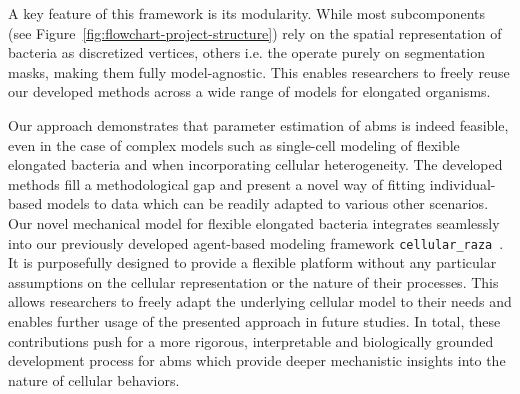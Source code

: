 A key feature of this framework is its modularity.
While most subcomponents (see Figure~\ref{fig:flowchart-project-structure}) rely on the spatial
representation of bacteria as discretized vertices, others i.e. the
 operate purely on segmentation masks, making them fully
model-agnostic.
This enables researchers to freely reuse our developed methods across a wide range of models for
elongated organisms.

Our approach demonstrates that parameter estimation of \acp{abm} is indeed feasible, even in
the case of complex models such as single-cell modeling of flexible elongated bacteria and when
incorporating cellular heterogeneity.
The developed methods fill a methodological gap and present a novel way of fitting individual-based
models to data which can be readily adapted to various other scenarios.
Our novel mechanical model for flexible elongated bacteria integrates seamlessly into our previously
developed agent-based modeling framework \texttt{cellular\_raza}~\cite{Pleyer2025}.
It is purposefully designed to provide a flexible platform without any particular assumptions on the
cellular representation or the nature of their processes.
This allows researchers to freely adapt the underlying cellular model to their needs and enables
further usage of the presented approach in future studies.
In total, these contributions push for a more rigorous, interpretable and biologically grounded
development process for \acp{abm} which provide deeper mechanistic insights into the nature of
cellular behaviors.

